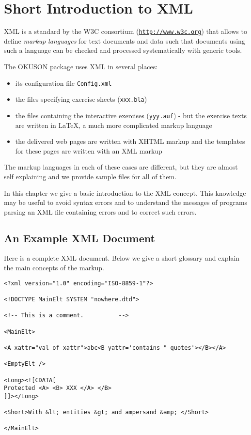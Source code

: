 \documentclass[12pt,openany,a4paper]{book}
\newcommand{\OKUSON}{\textsf{OKUSON}}
\begin{document}

\chapter{Short Introduction to XML}\label{ch:introXML}

XML is a standard by the W3C consortium
(\href{http://www.w3c.org}{\texttt{http://www.w3c.org}}) that allows
to define \emph{markup languages} for text documents and data such
that documents using such a language can be checked and processed
systematically with generic tools.

The {\OKUSON} package uses XML in several places:
\begin{itemize}
\item its configuration file \texttt{Config.xml} 
\item the files specifying exercise sheets (\texttt{xxx.bla})
\item the files containing the interactive exercises (\texttt{yyy.auf}) -
but the exercise texts are written in {\LaTeX}, a much more complicated
markup language
\item the delivered web pages are written with XHTML markup and the
templates for these pages are written with an XML markup  
\end{itemize}

The markup languages in each of these cases are different, but they are
almost self explaining and we provide sample files for all of them. 

In this chapter we give a basic introduction to the XML concept. This
knowledge may be useful to avoid syntax errors and to understand the messages 
of programs parsing an XML file containing errors and to correct such errors.

\section{An Example XML Document}\label{sec:exampleXML}
\label{sec:XMLbasics}

Here is a complete XML document. Below we give a short glossary  and explain
the main concepts of the markup.

\begin{verbatim}
<?xml version="1.0" encoding="ISO-8859-1"?>

<!DOCTYPE MainElt SYSTEM "nowhere.dtd">

<!-- This is a comment.          -->

<MainElt>

<A xattr="val of xattr">abc<B yattr='contains " quotes'></B></A> 

<EmptyElt />

<Long><![CDATA[
Protected <A> <B> XXX </A> </B>
]]></Long>

<Short>With &lt; entities &gt; and ampersand &amp; </Short>

</MainElt>

\end{verbatim}
\end{document}

